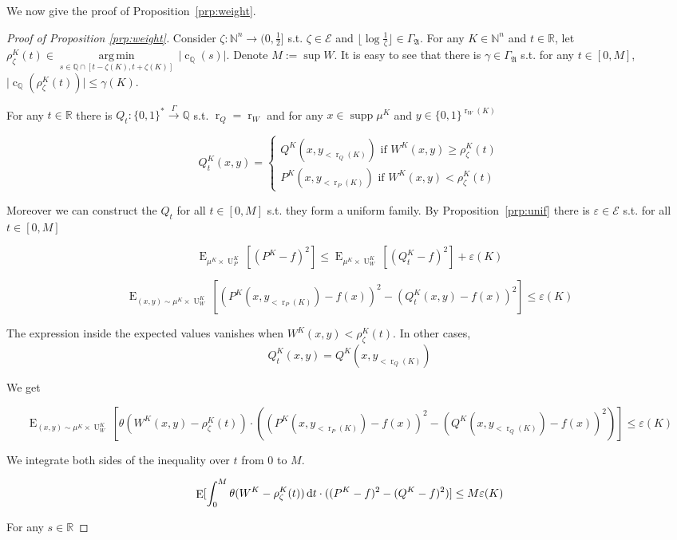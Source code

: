 \documentclass{article}
\numberwithin{equation}{section}
\theoremstyle{definition}
\theoremstyle{plain}
\newcommand{\Bool}{\{0,1\}}
\newcommand{\Words}{{\Bool^*}}
\newcommand{\WordsLen}[1]{{\Bool^{#1}}}
\DeclareMathOperator{\Supp}{supp}
\DeclareMathOperator{\E}{E}
\DeclareMathOperator{\R}{r}
\DeclareMathOperator{\Un}{U}
\DeclareMathOperator{\En}{c}
\newcommand{\Argmin}[1]{\underset{#1}{\operatorname{arg\,min}}\,}
\newcommand{\Nats}{\mathbb{N}}
\newcommand{\Rats}{\mathbb{Q}}
\newcommand{\Reals}{\mathbb{R}}
\newcommand{\NatFun}{\Nats^n \rightarrow}
\newcommand{\Abs}[1]{\lvert #1 \rvert}
\newcommand{\Floor}[1]{\lfloor #1 \rfloor}
\newcommand{\GrowA}{\Gamma_{\mathfrak{A}}}
\newcommand{\Fall}{\mathcal{E}}
\newcommand{\Scheme}{\xrightarrow{\Gamma}}
\begin{document}
We now give the proof of Proposition~\ref{prp:weight}.

\begin{proof}[Proof of Proposition \ref{prp:weight}]

Consider $\zeta: \NatFun (0,\frac{1}{2}]$ s.t.  $\zeta \in \Fall$ and $\Floor{\log \frac{1}{\zeta}} \in \GrowA$. For any $K \in \Nats^n$ and $t \in \Reals$, let $\rho_\zeta^{K}(t) \in \Argmin{s \in \Rats \cap [t-\zeta(K),t+\zeta(K)]} \Abs{\En_\Rats(s)}$. Denote $M:= \sup W$. It is easy to see that there is $\gamma \in \GrowA$ s.t. for any $t \in [0, M]$, ${\Abs{\En_\Rats(\rho_\zeta^{K}(t))} \leq \gamma(K)}$.

For any $t \in \Reals$ there is $Q_t: \Words \Scheme \Rats$ s.t. $\R_Q=\R_W$ and for any ${x \in \Supp \mu^{K}}$ and ${y \in \WordsLen{\R_W(K)}}$

$$Q_t^{K}(x,y)=\begin{cases}Q^{K}(x,y_{< \R_Q(K)}) \text{ if } W^{K}(x,y) \geq \rho^{K}_\zeta(t) \\ P^{K}(x,y_{< \R_P(K)}) \text{ if } W^{K}(x,y) < \rho^{K}_\zeta(t)\end{cases}$$

Moreover we can construct the $Q_t$ for all $t \in [0, M]$ s.t. they form a uniform family. By Proposition~\ref{prp:unif} there is $\varepsilon \in \Fall$ s.t. for all $t \in [0, M]$

$$\E_{\mu^{K} \times \Un_P^{K}}[(P^{K}-f)^2] \leq \E_{\mu^{K} \times \Un_W^{K}}[(Q_t^{K}-f)^2] + \varepsilon(K)$$

$$\E_{(x,y) \sim \mu^{K} \times \Un_W^{K}}[(P^{K}(x,y_{< \R_P(K)})-f(x))^2-(Q_t^{K}(x,y)-f(x))^2] \leq \varepsilon(K)$$

The expression inside the expected values vanishes when $W^{K}(x,y) < \rho^{K}_\zeta(t)$. In other cases, 
\[Q_t^{K}(x,y) = Q^{K}(x,y_{< \R_Q(K)})\]

We get

$$\E_{(x,y) \sim \mu^{K} \times \Un_W^{K}}[\theta(W^{K}(x,y)-\rho_\zeta^{K}(t)) \cdot ((P^{K}(x,y_{< \R_P(K)})-f(x))^2-(Q^{K}(x,y_{< \R_Q(K)})-f(x))^2)] \leq \varepsilon(K)$$

We integrate both sides of the inequality over $t$ from 0 to $M$.

\begin{equation}
\label{eqn:prp__weight__prf1}
\E[\int_0^M\theta(W^{K}-\rho_\zeta^{K}(t)) \dif t \cdot ((P^{K}-f)^2-(Q^{K}-f)^2)] \leq M \varepsilon(K)
\end{equation}

For any $s \in \Reals$


\end{proof}
\end{document}
